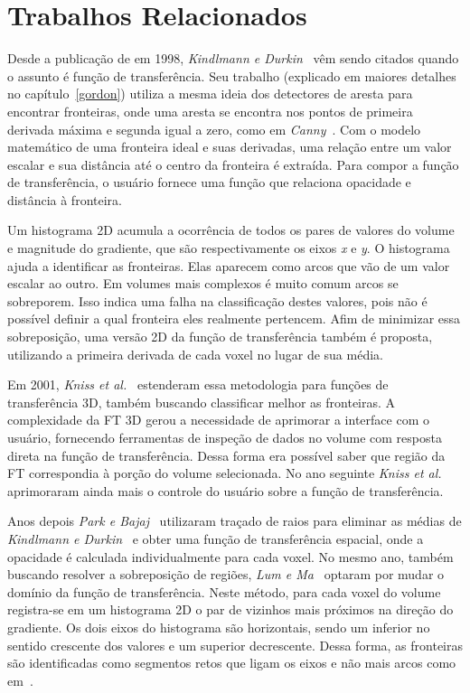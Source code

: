 
\chapter{Trabalhos Relacionados}
\label{related}
	Desde a publicação de  em 1998, \textit{Kindlmann e Durkin}~\cite{gordon} vêm sendo citados quando o assunto é função de transferência. Seu trabalho (explicado em maiores detalhes no capítulo~\ref{gordon}) utiliza a mesma ideia dos detectores de aresta para encontrar fronteiras, onde uma aresta se encontra nos pontos de primeira derivada máxima e segunda igual a zero, como em \textit{Canny}~\cite{canny}. Com o modelo matemático de uma fronteira ideal e suas derivadas, uma relação entre um valor escalar e sua distância até o centro da fronteira é extraída. Para compor a função de transferência, o usuário fornece uma função que relaciona opacidade e distância à fronteira. 
	
	Um histograma 2D acumula a ocorrência de todos os pares de valores do volume e magnitude do gradiente, que são respectivamente os eixos \textit{x} e \textit{y}. O histograma ajuda a identificar as fronteiras. Elas aparecem como arcos que vão de um valor escalar ao outro. Em volumes mais complexos é muito comum arcos se sobreporem. Isso indica uma falha na classificação destes valores, pois não é possível definir a qual fronteira eles realmente pertencem. Afim de minimizar essa sobreposição, uma versão 2D da função de transferência também é proposta, utilizando a primeira derivada de cada voxel no lugar de sua média.
	
	Em 2001, \textit{Kniss et al.}~\cite{kniss1} estenderam essa metodologia para funções de transferência 3D, também buscando classificar melhor as fronteiras. A complexidade da FT 3D gerou a necessidade de aprimorar a interface com o usuário, fornecendo ferramentas de inspeção de dados no volume com resposta direta na função de transferência. Dessa forma era possível saber que região da FT correspondia à porção do volume selecionada. No ano seguinte \textit{Kniss et al.}~\cite{kniss2} aprimoraram ainda mais o controle do usuário sobre a função de transferência.
	
	Anos depois \textit{Park e Bajaj}~\cite{park} utilizaram traçado de raios para eliminar as médias de \textit{Kindlmann e Durkin}~\cite{gordon} e obter uma função de transferência espacial, onde a opacidade é calculada individualmente para cada voxel. No mesmo ano, também buscando resolver a sobreposição de regiões, \textit{Lum e Ma}~\cite{lumema} optaram por mudar o domínio da função de transferência. Neste método, para cada voxel do volume registra-se em um histograma 2D o par de vizinhos mais próximos na direção do gradiente. Os dois eixos do histograma são horizontais, sendo um inferior no sentido crescente dos valores e um superior decrescente. Dessa forma, as fronteiras são identificadas como segmentos retos que ligam os eixos e não mais arcos como em~\cite{gordon}.
	
